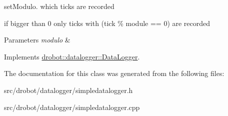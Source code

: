 set\-Modulo. which ticks are recorded 

if bigger than 0 only ticks with (tick \% module == 0) are recorded 
\begin{DoxyParams}{Parameters}
{\em modulo} & \\
\hline
\end{DoxyParams}


Implements \hyperlink{classdrobot_1_1datalogger_1_1DataLogger_ae463aebd8cb38c716bef83d5732042b1}{drobot\-::datalogger\-::\-Data\-Logger}.



The documentation for this class was generated from the following files\-:\begin{DoxyCompactItemize}
\item 
src/drobot/datalogger/simpledatalogger.\-h\item 
src/drobot/datalogger/simpledatalogger.\-cpp\end{DoxyCompactItemize}

